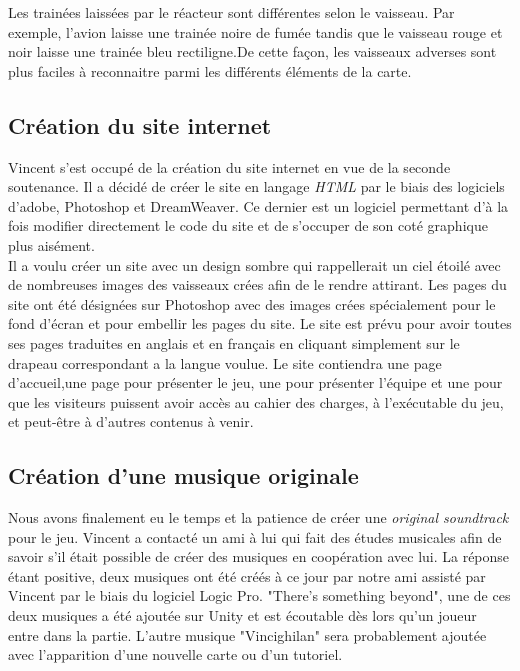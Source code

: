\documentclass[10pt, titlepage]{report}
\begin{document}
Les trainées laissées par le réacteur sont différentes selon le vaisseau. Par exemple, l'avion laisse une trainée noire de fumée tandis que le vaisseau rouge et noir laisse une trainée bleu rectiligne.De cette façon, les vaisseaux adverses sont plus faciles à reconnaitre parmi les différents éléments de la carte. \\

\subsection{Création du site internet}
Vincent s'est occupé de la création du site internet en vue de la seconde soutenance. Il a décidé de créer le site en langage \textit{HTML} par le biais des logiciels d'adobe, Photoshop et DreamWeaver. Ce dernier est un logiciel permettant d'à la fois modifier directement le code du site et de s'occuper de son coté graphique plus aisément.\\

Il a voulu créer un site avec un design sombre qui rappellerait un ciel étoilé avec de nombreuses images des vaisseaux crées afin de le rendre attirant. Les pages du site ont été désignées sur Photoshop avec des images crées spécialement pour le fond d'écran et pour embellir les pages du site. Le site est prévu pour avoir toutes ses pages traduites en anglais et en français en cliquant simplement sur le drapeau correspondant a la langue voulue. Le site contiendra une page d'accueil,une page pour présenter le jeu, une pour présenter l'équipe et une pour que les visiteurs puissent avoir accès au cahier des charges, à l'exécutable du jeu, et peut-être à d'autres contenus à venir.\\

\subsection{Création d'une musique originale}
Nous avons finalement eu le temps et la patience de créer une \textit{original soundtrack} pour le jeu. Vincent a contacté un ami à lui qui fait des études musicales afin de savoir s'il était possible de créer des musiques en coopération avec lui. La réponse étant positive, deux musiques ont été créés à ce jour par notre ami assisté par Vincent par le biais du logiciel Logic Pro. "There's something beyond", une de ces deux musiques a été ajoutée sur Unity et est écoutable dès lors qu'un joueur entre dans la partie. L'autre musique "Vincighilan" sera probablement ajoutée avec l'apparition d'une nouvelle carte ou d'un tutoriel.
\end{document}
